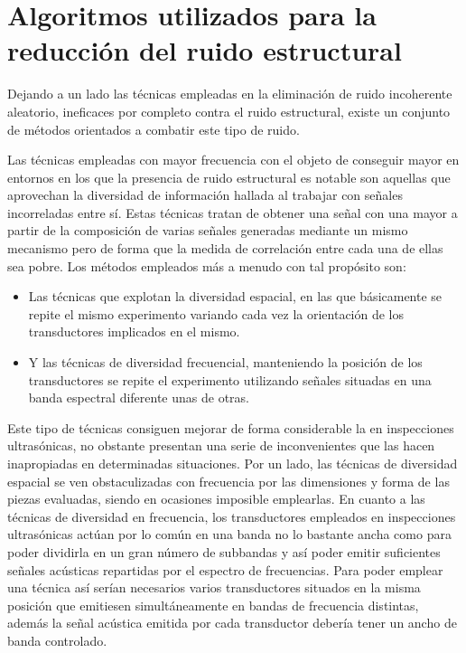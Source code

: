 \section[Algoritmos para la reducción del ruido estructural]{Algoritmos
utilizados para la reducción del ruido estructural}

Dejando a un lado las técnicas empleadas en la eliminación de ruido
incoherente aleatorio, ineficaces por completo contra el ruido estructural,
existe un conjunto de métodos orientados a combatir este tipo de ruido.

Las técnicas empleadas con mayor frecuencia con el objeto de conseguir
mayor  en entornos en los que la presencia de ruido estructural es
notable son aquellas que aprovechan la diversidad de información hallada al
trabajar con señales incorreladas entre sí. Estas técnicas tratan de
obtener una señal con una mayor  a partir de la composición de
varias señales generadas mediante un mismo mecanismo pero de forma que la
medida de correlación entre cada una de ellas sea pobre. Los métodos
empleados más a menudo con tal propósito son:

\begin{itemize}
	\item Las técnicas que explotan la diversidad espacial, en las que
		básicamente se repite el mismo experimento variando cada
		vez la orientación de los transductores implicados en el
		mismo.
	\item Y las técnicas de diversidad frecuencial, manteniendo la
		posición de los transductores se repite el experimento
		utilizando señales situadas en una banda espectral
		diferente unas de otras.
\end{itemize}

Este tipo de técnicas consiguen mejorar de forma considerable la 
en inspecciones ultrasónicas, no obstante presentan una serie de
inconvenientes que las hacen inapropiadas en determinadas situaciones. Por
un lado, las técnicas de diversidad espacial se ven obstaculizadas con
frecuencia por las dimensiones y forma de las piezas evaluadas, siendo en
ocasiones imposible emplearlas. En cuanto a las técnicas de diversidad en
frecuencia, los transductores empleados en inspecciones ultrasónicas actúan
por lo común en una banda no lo bastante ancha como para poder dividirla en
un gran número de subbandas y así poder emitir suficientes señales
acústicas repartidas por el espectro de frecuencias. Para poder emplear una
técnica así serían necesarios varios transductores situados en la misma
posición que emitiesen simultáneamente en bandas de frecuencia distintas,
además la señal acústica emitida por cada transductor debería tener un
ancho de banda controlado.

